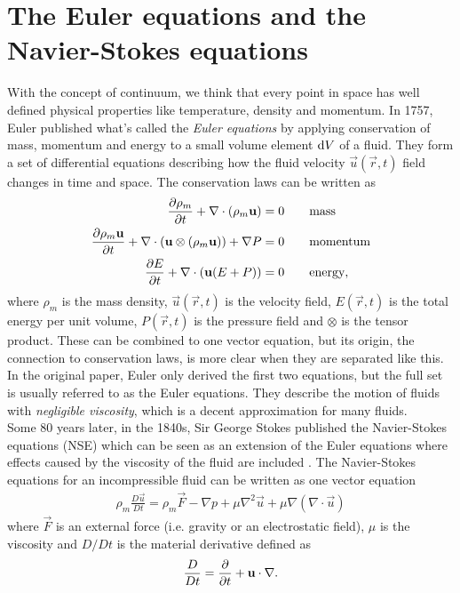 \section{The Euler equations and the Navier-Stokes equations}
\label{sec:theory_of_fluids_euler_navier}
With the concept of continuum, we think that every point in space has well defined physical properties like temperature, density and momentum. In 1757, Euler published what's called the \textit{Euler equations} by applying conservation of mass, momentum and energy to a small volume element $\mathrm{d}V$ of a fluid. They form a set of differential equations describing how the fluid velocity $\vec u(\vec r, t)$ field changes in time and space. The conservation laws can be written as
\begin{align}
	\frac{\partial \rho_m}{\partial t} + \nabla\cdot (\rho_m\mathbf u) &= 0 \qquad \text{mass}\\
	\frac{\partial \rho_m \mathbf u}{\partial t} + \nabla \cdot (\mathbf u \otimes (\rho_m\mathbf u)) + \nabla P &= 0\qquad \text{momentum}\\
	\frac{\partial E}{\partial t} + \nabla\cdot (\mathbf u(E + P)) &= 0\qquad \text{energy},
\end{align}
where $\rho_m$ is the mass density, $\vec u(\vec r, t)$ is the velocity field, $E(\vec r, t)$ is the total energy per unit volume, $P(\vec r, t)$ is the pressure field and $\otimes$ is the tensor product. These can be combined to one vector equation, but its origin, the connection to conservation laws, is more clear when they are separated like this. In the original paper, Euler only derived the first two equations, but the full set is usually referred to as the Euler equations. They describe the motion of fluids with \textit{negligible viscosity}, which is a decent approximation for many fluids.\\
Some 80 years later, in the 1840s, Sir George Stokes published the Navier-Stokes equations (NSE) which can be seen as an extension of the Euler equations where effects caused by the viscosity of the fluid are included \cite{batchelor2000introduction}. The Navier-Stokes equations for an incompressible fluid can be written as one vector equation
\begin{align}
	\label{eq:nse}
	\rho_m \frac{D\vec u}{ Dt} = \rho_m \vec F - \nabla p + \mu\nabla^2\vec u + \mu\nabla(\nabla\cdot \vec u)
\end{align}
where $\vec F$ is an external force (i.e. gravity or an electrostatic field), $\mu$ is the viscosity and $D/Dt$ is the material derivative defined as
\begin{align}
	\frac{D}{Dt} = \frac{\partial }{\partial t} + \mathbf u\cdot \nabla.
\end{align}
